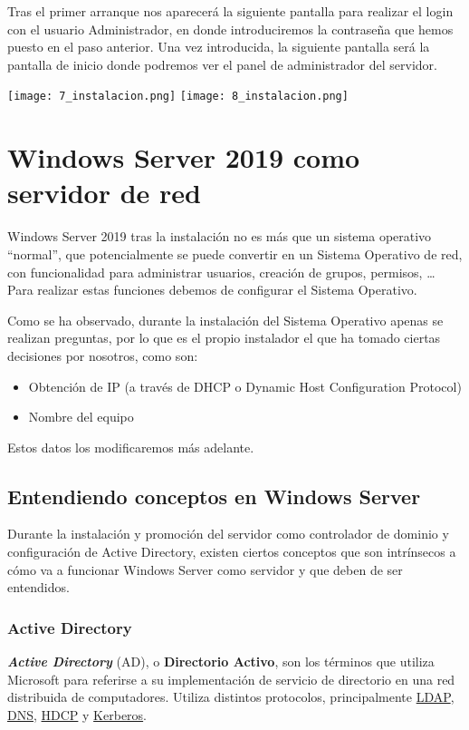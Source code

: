 Tras el primer arranque nos aparecerá la siguiente pantalla para realizar el login con el usuario Administrador, en donde introduciremos la contraseña que hemos puesto en el paso anterior. Una vez introducida, la siguiente pantalla será la pantalla de inicio donde podremos ver el panel de administrador del servidor.

\begin{tcolorbox}[title=Windows Server 2019 recién instalado,colback=white]
    \texttt{[image: 7\_instalacion.png]}
    \hfill
    \texttt{[image: 8\_instalacion.png]}
\end{tcolorbox}


\chapter{Windows Server 2019 como servidor de red}
Windows Server 2019 tras la instalación no es más que un sistema operativo “normal”, que potencialmente se puede convertir en un Sistema Operativo de red, con funcionalidad para administrar usuarios, creación de grupos, permisos, … Para realizar estas funciones debemos de configurar el Sistema Operativo.

Como se ha observado, durante la instalación del Sistema Operativo apenas se realizan preguntas, por lo que es el propio instalador el que ha tomado ciertas decisiones por nosotros, como son:

\begin{itemize}
    \item Obtención de IP (a través de DHCP o Dynamic Host Configuration Protocol)
    \item Nombre del equipo
\end{itemize}

Estos datos los modificaremos más adelante.


\section{Entendiendo conceptos en Windows Server}
Durante la instalación y promoción del servidor como controlador de dominio y configuración de Active Directory, existen ciertos conceptos que son intrínsecos a cómo va a funcionar Windows Server como servidor  y que deben de ser entendidos.


\subsection{Active Directory}
\textbf{\textit{Active Directory}} (AD), o \textbf{Directorio Activo}, son los términos que utiliza Microsoft para referirse a su implementación de servicio de directorio en una red distribuida de computadores. Utiliza distintos protocolos, principalmente \href{https://es.wikipedia.org/wiki/Protocolo_ligero_de_acceso_a_directorios}{LDAP}, \href{https://es.wikipedia.org/wiki/Sistema_de_nombres_de_dominio}{DNS}, \href{https://es.wikipedia.org/wiki/Protocolo_de_configuraci%C3%B3n_din%C3%A1mica_de_host}{HDCP} y \href{https://es.wikipedia.org/wiki/Kerberos}{Kerberos}.

